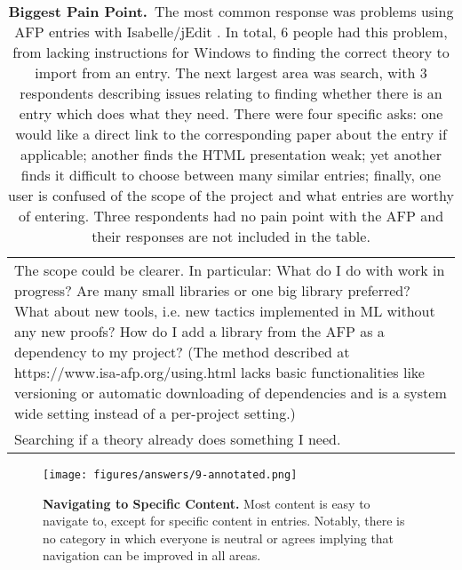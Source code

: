 \documentclass[bsc,frontabs,oneside,singlespacing,parskip,deptreport,logo]{infthesis}
\begin{document}
\begin{table}[h!]
\begin{tabularx}{\textwidth}{X}
\footnotesize
The scope could be clearer. In particular: What do I do with work in progress? Are many small libraries or one big library preferred? What about new tools, i.e. new tactics implemented in ML without any new proofs? How do I add a library from the AFP as a dependency to my project? (The method described at  https://www.isa-afp.org/using.html lacks basic functionalities like versioning or automatic downloading of dependencies and is a system wide setting instead of a per-project setting.)\\
\footnotesize
Searching if a theory already does something I need.\\
\hline
\end{tabularx}
\vspace{0.3cm}
\caption{\textbf{Biggest Pain Point.}~The most common response was problems using AFP entries with Isabelle/jEdit \cite{wenzel2012isabelle}. In total, 6 people had this problem, from lacking instructions for Windows to finding the correct theory to import from an entry. The next largest area was search, with 3 respondents describing issues relating to finding whether there is an entry which does what they need. There were four specific asks: one would like a direct link to the corresponding paper about the entry if applicable; another finds the HTML presentation weak; yet another finds it difficult to choose between many similar entries; finally, one user is confused of the scope of the project and what entries are worthy of entering. Three respondents had no pain point with the AFP and their responses are not included in the table.}
    \label{fig:pain-point}
\end{table}

\clearpage 

\begin{figure}[h!]
    \centering
    \texttt{[image: figures/answers/9-annotated.png]}
    \caption{\textbf{Navigating to Specific Content.}
    Most content is easy to navigate to, except for specific content in entries. Notably, there is no category in which everyone is neutral or agrees implying that navigation can be improved in all areas.}
    \label{fig:navigating-to-specific-content}
    \medskip
\end{figure}

\end{document}
